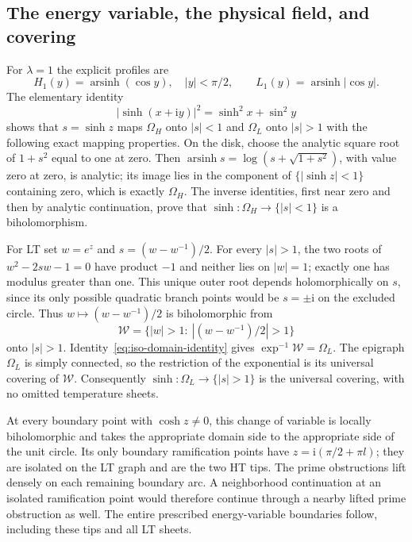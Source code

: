 \documentclass[11pt]{article}
\numberwithin{equation}{section}
\theoremstyle{definition}
\newcommand{\ii}{\mathrm i}
\begin{document}
\subsection{The energy variable, the physical field, and covering}

For $\lambda=1$ the explicit profiles are
\[
 H_1(y)=\operatorname{arsinh}(\cos y),\quad |y|<\pi/2,
 \qquad L_1(y)=\operatorname{arsinh}|\cos y|.
\]
The elementary identity
\begin{equation}\label{eq:iso-domain-identity}
 |\sinh(x+\ii y)|^2=\sinh^2x+\sin^2y
\end{equation}
shows that $s=\sinh z$ maps $\Omega_H$ onto $|s|<1$ and
$\Omega_L$ onto $|s|>1$ with the following exact mapping properties.
On the disk, choose the analytic square root of $1+s^2$ equal to
one at zero.  Then
$\operatorname{arsinh}s=\log(s+\sqrt{1+s^2})$, with value zero at
zero, is analytic; its image lies in the component of
$\{|\sinh z|<1\}$ containing zero, which is exactly $\Omega_H$.
The inverse identities, first near zero and then by analytic
continuation, prove that $\sinh:\Omega_H\to\{|s|<1\}$ is a
biholomorphism.

For LT set $w=e^z$ and $s=(w-w^{-1})/2$.
For every $|s|>1$, the two roots of
$w^2-2sw-1=0$ have product $-1$ and neither lies on $|w|=1$;
exactly one has modulus greater than one.  This unique outer root
depends holomorphically on $s$, since its only possible quadratic
branch points would be $s=\pm\ii$ on the excluded circle.
Thus $w\mapsto(w-w^{-1})/2$ is biholomorphic from
\[
 \mathcal W=\{|w|>1:\ |(w-w^{-1})/2|>1\}
\]
onto $|s|>1$.  Identity~\eqref{eq:iso-domain-identity} gives
$\exp^{-1}\mathcal W=\Omega_L$.
The epigraph $\Omega_L$ is simply connected, so the restriction
of the exponential is its universal covering of $\mathcal W$.
Consequently $\sinh:\Omega_L\to\{|s|>1\}$ is the universal
covering, with no omitted temperature sheets.

At every boundary point with $\cosh z\ne0$, this change of variable
is locally biholomorphic and takes the appropriate domain side to
the appropriate side of the unit circle.
Its only boundary ramification points have
$z=\ii(\pi/2+\pi l)$; they are isolated on the LT graph and are
the two HT tips.  The prime obstructions lift densely on each
remaining boundary arc.  A neighborhood continuation at an isolated
ramification point would therefore continue through a nearby lifted
prime obstruction as well.  The entire prescribed energy-variable
boundaries follow, including these tips and all LT sheets.
\end{document}
